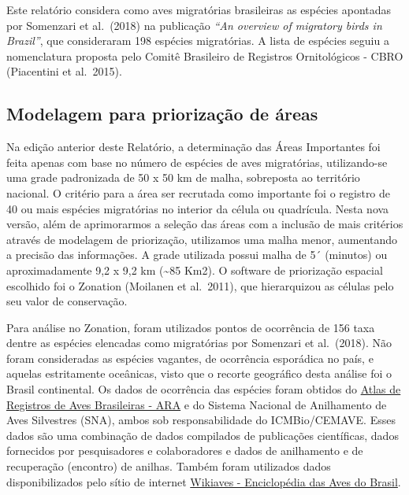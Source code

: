 \documentclass[
]{scrbook}
\begin{document}
Este relatório considera como aves migratórias brasileiras as espécies apontadas por Somenzari et al.~(2018) na publicação \emph{``An overview of migratory birds in Brazil''}, que consideraram 198 espécies migratórias. A lista de espécies seguiu a nomenclatura proposta pelo Comitê Brasileiro de Registros Ornitológicos - CBRO (Piacentini et al.~2015).

\hypertarget{modelagem}{%
\subsection{Modelagem para priorização de áreas}\label{modelagem}}

Na edição anterior deste Relatório, a determinação das Áreas Importantes foi feita apenas com base no número de espécies de aves migratórias, utilizando-se uma grade padronizada de 50 x 50 km de malha, sobreposta ao território nacional. O critério para a área ser recrutada como importante foi o registro de 40 ou mais espécies migratórias no interior da célula ou quadrícula. Nesta nova versão, além de aprimorarmos a seleção das áreas com a inclusão de mais critérios através de modelagem de priorização, utilizamos uma malha menor, aumentando a precisão das informações. A grade utilizada possui malha de 5´ (minutos) ou aproximadamente 9,2 x 9,2 km (\textasciitilde85 Km2). O software de priorização espacial escolhido foi o Zonation (Moilanen et al.~2011), que hierarquizou as células pelo seu valor de conservação.

Para análise no Zonation, foram utilizados pontos de ocorrência de 156 taxa dentre as espécies elencadas como migratórias por Somenzari et al.~(2018). Não foram consideradas as espécies vagantes, de ocorrência esporádica no país, e aquelas estritamente oceânicas, visto que o recorte geográfico desta análise foi o Brasil continental. Os dados de ocorrência das espécies foram obtidos do \href{http://ara.cemave.gov.br}{Atlas de Registros de Aves Brasileiras - ARA} e do Sistema Nacional de Anilhamento de Aves Silvestres (SNA), ambos sob responsabilidade do ICMBio/CEMAVE. Esses dados são uma combinação de dados compilados de publicações científicas, dados fornecidos por pesquisadores e colaboradores e dados de anilhamento e de recuperação (encontro) de anilhas. Também foram utilizados dados disponibilizados pelo sítio de internet \href{http://www.wikiaves.com}{Wikiaves - Enciclopédia das Aves do Brasil}.
\end{document}
